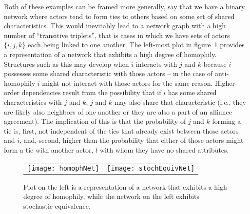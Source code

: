 Both of these examples can be framed more generally, say that we have a binary network where actors tend to form ties to others based on some set of shared characteristics. This would inevitably lead to a network graph with a high number of ``transitive triplets'', that is cases in which we have sets of actors $\{i,j,k\}$ each being linked to one another. The left-most plot in figure~\ref{fig:homphStochEquivNet} provides a representation of a network that exhibits a high degree of homophily.  Structures such as this may develop when $i$ interacts with $j$ and $k$ because $i$ possesses some shared characteristic with those actors -- in the case of anti-homophily $i$ might not interact with those actors for the same reason. Higher-order dependencies result from the possibility that if $i$ has some shared characteristics with $j$ and $k$, $j$ and $k$ may also share that characteristic (i.e., they are likely also neighbors of one another or they are also a part of an alliance agreement). The implication of this is that the probability of $j$ and $k$ forming a tie is, first, not independent of the ties that already exist between those actors and $i$, and, second, higher than the probability that either of those actors might form a tie with another actor, $l$ with whom they have no shared attributes. 


\begin{figure}[ht]
	\centering
	\begin{tabular}{lr}
	\texttt{[image: homophNet]} & 
	\texttt{[image: stochEquivNet]}	
	\end{tabular}
	\caption{Plot on the left is a representation of a network that exhibits a high degree of homophily, while the network on the left exhibits stochastic equivalence. }
	\label{fig:homphStochEquivNet}
\end{figure}


